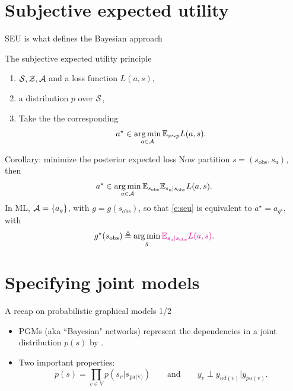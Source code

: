 \documentclass[10pt]{beamer}
\begin{document}
\section{Subjective expected utility}
\begin{frame}{SEU is what defines the Bayesian approach}
\begin{block}{The subjective expected utility principle}
\begin{enumerate}
\item {} $\mathcal{S}, \mathcal{Z}, \mathcal{A}$ and a loss function $L(a,s)$,
\item {} a distribution $p$ over $\mathcal{S}$,
\item Take the the corresponding 
\begin{equation}
a^\star \in \operatorname*{arg\,min}_{a\in\mathcal{A}} \mathbb{E}_{s\sim p} L(a,s).
\label{e:seu}
\end{equation}
\end{enumerate}
\end{block}
\vfill

\begin{block}{Corollary: minimize the posterior expected loss}
Now partition $s=(s_{\text{obs}}, s_{\text{u}})$, then 
$$ a^\star \in \operatorname*{arg\,min}_{a\in\mathcal{A}} \mathbb{E}_{s_{\text{obs}}} \mathbb{E}_{s_{\text{u}}\vert s_{\text{obs}}} L(a,s).$$
In ML, $\mathcal{A} = \{a_g\}$, with $g = g(s_\text{obs})$, so that
\eqref{e:seu} is equivalent to $a^\star = a_{g^\star}$, with
$$
g^\star (s_\text{obs}) \triangleq \operatorname*{arg\,min}_{g} \textcolor{magenta}{\mathbb{E}_{s_{\text{u}}\vert s_{\text{obs}}} L(a,s)}.$$
\end{block}
\end{frame}

\section{Specifying joint models}
\begin{frame}{A recap on probabilistic graphical models 1/2}
  \begin{itemize}
    \item PGMs (aka ``Bayesian" networks) represent the dependencies in a joint distribution $p(s)$ by .
    \item Two important properties:
    $$
    p(s) = \prod_{v\in V} p(s_v\vert s_{\text{pa(v)}}) \qquad\text{and}\qquad
    y_v \perp y_{nd(v)} \vert y_{pa(v)}.
    $$
    \blank
  \end{itemize}
  \blank
\end{frame}
\end{document}

